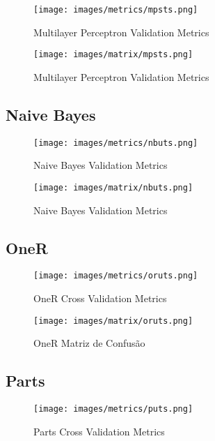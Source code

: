 \begin{figure}[H]
  \centering
  \texttt{[image: images/metrics/mpsts.png]}
  \caption{Multilayer Perceptron Validation Metrics}
  \label{fig:mp_uts_metrics}
\end{figure}

\begin{figure}[H]
  \centering
  \texttt{[image: images/matrix/mpsts.png]}
  \caption{Multilayer Perceptron Validation Metrics}
  \label{fig:mp_uts_matrix}
\end{figure}

\subsection{Naive Bayes}

\begin{figure}[H]
  \centering
  \texttt{[image: images/metrics/nbuts.png]}
  \caption{Naive Bayes Validation Metrics}
  \label{fig:nb_uts_metrics}
\end{figure}

\begin{figure}[H]
  \centering
  \texttt{[image: images/matrix/nbuts.png]}
  \caption{Naive Bayes Validation Metrics}
  \label{fig:nb_uts_matrix}
\end{figure}

\subsection{OneR}

\begin{figure}[H]
  \centering
  \texttt{[image: images/metrics/oruts.png]}
  \caption{OneR Cross Validation Metrics}
  \label{fig:or_uts_metrics}
\end{figure}

\begin{figure}[H]
  \centering
  \texttt{[image: images/matrix/oruts.png]}
  \caption{OneR Matriz de Confusão}
  \label{fig:or_uts_matrix}
\end{figure}

\subsection{Parts}

\begin{figure}[H]
  \centering
  \texttt{[image: images/metrics/puts.png]}
  \caption{Parts Cross Validation Metrics}
  \label{fig:p_uts_metrics}
\end{figure}

